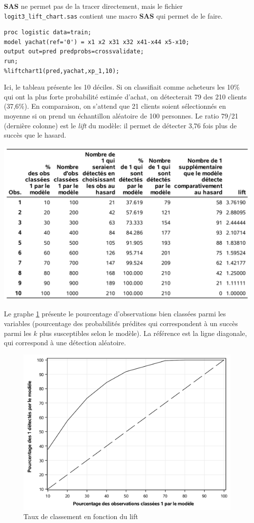 \documentclass[
  11pt,
  letterpaper,
]{book}
\theoremstyle{definition}
\theoremstyle{definition}
\theoremstyle{definition}
\theoremstyle{remark}
\begin{document}
\textbf{SAS} ne permet pas de la tracer directement, mais le fichier \texttt{logit3\_lift\_chart.sas} contient une macro \textbf{SAS} qui permet de le faire.

\begin{verbatim}
proc logistic data=train;
model yachat(ref='0') = x1 x2 x31 x32 x41-x44 x5-x10;
output out=pred predprobs=crossvalidate;
run;
%liftchart1(pred,yachat,xp_1,10);
\end{verbatim}

Ici, le tableau présente les 10 déciles. Si on classifiait comme acheteurs les 10\% qui ont la plus forte probabilité estimée d'achat, on détecterait 79 des 210 clients (37,6\%). En comparaison, on s'attend que 21 clients soient sélectionnés en moyenne si on prend un échantillon aléatoire de 100 personnes. Le ratio 79/21 (dernière colonne) est le \emph{lift} du modèle: il permet de détecter 3,76 fois plus de succès que le hasard.

\begin{center}\includegraphics[width=0.8\linewidth]{figures/03-logistic-e16} \end{center}

Le graphe \ref{fig:fig3-e17} présente le pourcentage d'observations bien classées parmi les variables (pourcentage des probabilités prédites qui correspondent à un succès parmi les \(k\) plus susceptibles selon le modèle). La référence est la ligne diagonale, qui correspond à une détection aléatoire.

\begin{figure}

{\centering \includegraphics[width=0.8\linewidth]{figures/03-logistic-e17} 

}

\caption{Taux de classement en fonction du lift}\label{fig:fig3-e17}
\end{figure}
\end{document}
